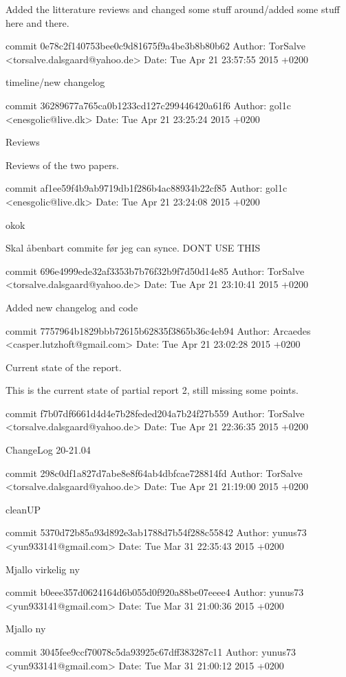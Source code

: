 \documentclass[12pt,a4paper]{article}
\begin{document}
Added the litterature reviews and changed some stuff around/added some
stuff here and there.

commit 0e78c2f140753bee0c9d81675f9a4be3b8b80b62
Author: TorSalve <torsalve.dalsgaard@yahoo.de>
Date:   Tue Apr 21 23:57:55 2015 +0200

timeline/new changelog

commit 36289677a765ca0b1233cd127c299446420a61f6
Author: gol1c <enesgolic@live.dk>
Date:   Tue Apr 21 23:25:24 2015 +0200

Reviews

Reviews of the two papers.

commit af1ee59f4b9ab9719db1f286b4ac88934b22cf85
Author: gol1c <enesgolic@live.dk>
Date:   Tue Apr 21 23:24:08 2015 +0200

okok

Skal åbenbart commite før jeg can synce. DONT USE THIS

commit 696e4999ede32af3353b7b76f32b9f7d50d14e85
Author: TorSalve <torsalve.dalsgaard@yahoo.de>
Date:   Tue Apr 21 23:10:41 2015 +0200

Added new changelog and code

commit 7757964b1829bbb72615b62835f3865b36c4eb94
Author: Arcaedes <casper.lutzhoft@gmail.com>
Date:   Tue Apr 21 23:02:28 2015 +0200

Current state of the report.

This is the current state of partial report 2, still missing some
points.

commit f7b07df6661d4d4e7b28feded204a7b24f27b559
Author: TorSalve <torsalve.dalsgaard@yahoo.de>
Date:   Tue Apr 21 22:36:35 2015 +0200

ChangeLog 20-21.04

commit 298c0df1a827d7abe8e8f64ab4dbfcae728814fd
Author: TorSalve <torsalve.dalsgaard@yahoo.de>
Date:   Tue Apr 21 21:19:00 2015 +0200

cleanUP

commit 5370d72b85a93d892e3ab1788d7b54f288c55842
Author: yunus73 <yun933141@gmail.com>
Date:   Tue Mar 31 22:35:43 2015 +0200

Mjallo virkelig ny

commit b0eee357d0624164d6b055d0f920a88be07eeee4
Author: yunus73 <yun933141@gmail.com>
Date:   Tue Mar 31 21:00:36 2015 +0200

Mjallo ny

commit 3045fee9ccf70078c5da93925c67dff383287c11
Author: yunus73 <yun933141@gmail.com>
Date:   Tue Mar 31 21:00:12 2015 +0200
\end{document}
